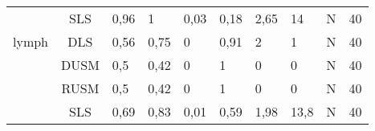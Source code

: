 \begin{tabular}{ccllllllll}
      & SLS &               0,96 &                               1 &                            0,03 &                              0,18 &                              2,65 &                            14 &                            N &                         40 \\
lymph & DLS &               0,56 &                            0,75 &                               0 &                              0,91 &                                 2 &                             1 &                            N &                         40 \\
      & DUSM &                0,5 &                            0,42 &                               0 &                                 1 &                                 0 &                             0 &                            N &                         40 \\
      & RUSM &                0,5 &                            0,42 &                               0 &                                 1 &                                 0 &                             0 &                            N &                         40 \\
      & SLS &               0,69 &                            0,83 &                            0,01 &                              0,59 &                              1,98 &                          13,8 &                            N &                         40 \\
\bottomrule
\end{tabular}
